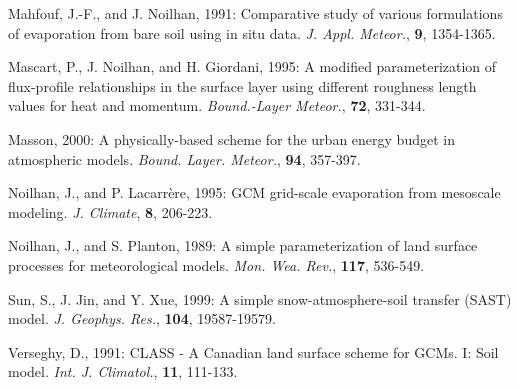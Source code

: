 \begin{description}
\item
Mahfouf, J.-F., and J. Noilhan, 1991:
Comparative study of various formulations of evaporation
from bare soil using in situ data.
{\em J. Appl. Meteor.}, {\bf 9}, 1354-1365.


\item
Mascart, P., J. Noilhan, and H. Giordani, 1995:
A modified parameterization of flux-profile relationships
in the surface layer using different roughness length
values for heat and momentum.
{\em Bound.-Layer Meteor.}, {\bf 72}, 331-344.

\item
Masson, 2000:
A physically-based scheme for the urban energy budget in atmospheric models.
{\it Bound. Layer. Meteor.},  {\bf 94}, 357-397.

\item
Noilhan, J., and P. Lacarr\`ere, 1995:
GCM grid-scale evaporation from mesoscale modeling.
{\em J. Climate}, {\bf 8}, 206-223. 

\item
Noilhan, J., and S. Planton, 1989:
A simple parameterization of land surface processes for
meteorological models.
{\em Mon. Wea. Rev.}, {\bf 117}, 536-549.

\item
Sun, S.,
J. Jin, and Y. Xue, 1999:
A simple snow-atmosphere-soil transfer (SAST) model.
{\em J. Geophys. Res.},
{\bf 104},
19587-19579.

\item
Verseghy, D., 1991:
CLASS - A Canadian land surface scheme for GCMs.
I:  Soil model.
{\em Int. J. Climatol.},
{\bf 11},
111-133.

\end{description}

